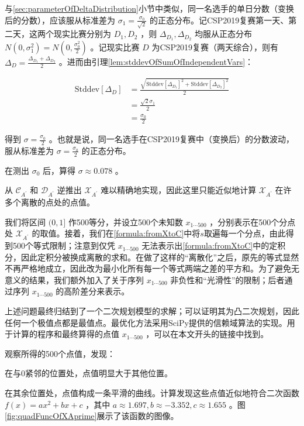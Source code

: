         与\ref{sec:parameterOfDeltaDistribution}小节中类似，同一名选手的单日分数（变换后的分数），应该服从标准差为 $\sigma_1=\frac {\sigma_0}{\sqrt 2}$ 的正态分布。记CSP2019复赛第一天、第二天，这两个现实比赛分别为 $D_1,D_2$ ，则 $\Delta_{D_1},\Delta_{D_2}$ 均服从正态分布 $N(0,\sigma_1^2)=N(0,\frac {\sigma_0^2}{2})$ 。记现实比赛 $D$ 为CSP2019复赛（两天综合），则有 $\Delta_D=\frac{\Delta_{D_1}+\Delta_{D_2}}2$ 。进而由引理\ref{lem:stddevOfSumOfIndependentVars}：
        
        \begin{align*}
            \mathrm{Stddev}\left[\Delta_D\right]&=\frac{\sqrt{\mathrm{Stddev}\left[\Delta_{D_1}\right]^2+\mathrm{Stddev}\left[\Delta_{D_2}\right]^2}}2 \\
                                                &=\frac{\sqrt{2}\sigma_1}{2} \\
                                                &=\frac{\sigma_0}{2}
        \end{align*}
        
        得到 $\sigma=\frac {\sigma_0}2$ 。也就是说，同一名选手在CSP2019复赛中（变换后）的分数波动，服从标准差为 $\sigma=\frac {\sigma_0}2$ 的正态分布。
        
        在测出 $\sigma_0$ 后，算得 $\sigma\approx0.078$ 。

        \vspace{1.5ex}

        从 $\mathcal{C}_{A^\prime}$ 和 $\mathcal{D}_{A^\prime}$ 逆推出 $\mathcal{X}_{A^\prime}$ 难以精确地实现，因此这里只能近似地计算 $\mathcal{X}_{A^\prime}$ 在许多个离散的点处的点值。

        我们将区间 $(0,1]$ 作500等分，并设立500个未知数 $x_{1\cdots 500}$ ，分别表示在500个分点处 $\mathcal{X}_{A^\prime}$ 的取值。接着，我们在\eqref{formula:fromXtoC}中将$s$取遍每一个分点，由此得到500个等式限制；注意到仅凭 $x_{1\cdots 500}$ 无法表示出\eqref{formula:fromXtoC}中的定积分，因此定积分被换成离散的求和。在做了这样的“离散化”之后，原先的等式显然不再严格地成立，因此改为最小化所有每一个等式两端之差的平方和。为了避免无意义的结果，我们额外加入了关于序列 $x_{1\cdots 500}$ 非负性和“光滑性”的限制；后者通过序列 $x_{1\cdots 500}$ 的高阶差分来表示。

        上述问题最终归结到了一个二次规划模型的求解；可以证明其为凸二次规划，因此任何一个极值点都是最值点。最优化方法采用SciPy提供的信赖域算法的实现\cite{scipy_minimize}。用于计算的程序和最终算得的点值 $x_{1\cdots 500}$ ，可以在本文开头的链接中找到。

        观察所得的500个点值，发现：
        \begin{asparaenum}
            \item 在与0紧邻的位置处，点值明显大于其他位置。
            \item 在其余位置处，点值构成一条平滑的曲线。计算发现这些点值近似地符合二次函数 $f(x)=ax^2+bx+c$ ，其中 $a\approx 1.697,b\approx -3.352,c\approx 1.655$ 。图\ref{fig:quadFuncOfXAprime}展示了该函数的图像。
        \end{asparaenum}

